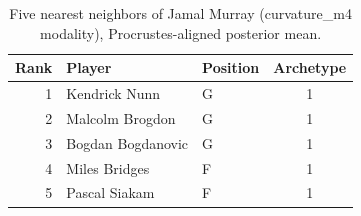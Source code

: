 \begin{table}[htbp]
  \centering\small
  \begin{tabular}{rllc}
    \toprule
    Rank & Player & Position & Archetype \\
    \midrule
    1 & Kendrick Nunn & G & 1 \\
    2 & Malcolm Brogdon & G & 1 \\
    3 & Bogdan Bogdanovic & G & 1 \\
    4 & Miles Bridges & F & 1 \\
    5 & Pascal Siakam & F & 1 \\
    \bottomrule
  \end{tabular}
  \caption{Five nearest neighbors of Jamal Murray (curvature_m4 modality), Procrustes-aligned posterior mean.}
  \label{tab:Jamal_Murray_neighbors_curvature_m4}
\end{table}

